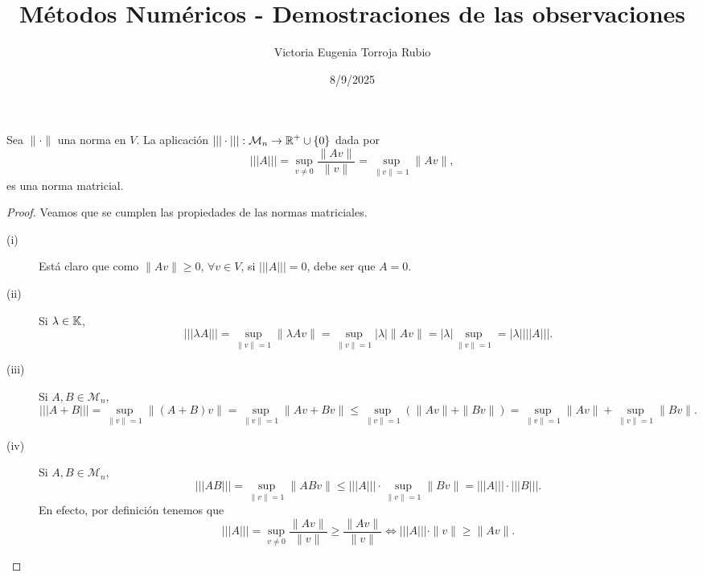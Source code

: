 \documentclass{article}
\begin{document}
\title{Métodos Numéricos - Demostraciones de las observaciones}
\author{Victoria Eugenia Torroja Rubio}
\date{8/9/2025}

\maketitle

\begin{prop}
	Sea $\displaystyle \| \cdot \|  $ una norma en $\displaystyle V $. La aplicación $\displaystyle | | | \cdot | | | : \mathcal{M}_{n} \to \mathbb{R}^{+}\cup \left\{ 0\right\}  $ dada por 
	\[ | | | A | | | = \sup_{v \neq 0}\frac{\| Av \|}{\|v\|} = \sup_{\|v\|=1}\|Av\| ,\]
	es una norma matricial.
\end{prop}
\begin{proof}
Veamos que se cumplen las propiedades de las normas matriciales.
\begin{description}
\item[(i)] Está claro que como $\displaystyle \| A v\| \geq 0 $, $\displaystyle \forall v \in V $, si $\displaystyle | | | A | | | = 0 $, debe ser que $\displaystyle A = 0$.
\item[(ii)] Si $\displaystyle \lambda \in \mathbb{K} $, 
	\[| | | \lambda A | | | = \sup_{\|v\| = 1}\|\lambda Av\| = \sup_{\|v\| = 1} \left|\lambda \right|\|Av\| = \left|\lambda \right|\sup_{\|v\| = 1} = \left|\lambda \right| | | | A | | | .\]
\item[(iii)] Si $\displaystyle A,B \in \mathcal{M}_{n} $,
	\[ | | | A + B | | | = \sup_{\|v\| = 1}\| \left(A + B\right) v \| = \sup_{\|v\| = 1} \| A v + Bv \| \leq \sup_{\|v\| = 1}\left(\|Av\|+\|Bv\|\right) = \sup_{\|v\| = 1}\|Av\| + \sup_{\|v\| = 1}\|Bv\| .\]
\item[(iv)] Si $\displaystyle A,B \in \mathcal{M}_{n} $,
	\[| | | AB | | | = \sup_{\|v\| = 1}\|ABv\| \leq | | | A | | | \cdot \sup_{\|v\| = 1}\|Bv\| = | | | A | | | \cdot | | | B | | | .\]
	En efecto, por definición tenemos que 
	\[ | | | A | | | = \sup_{v \neq 0}\frac{\|Av\|}{\|v\|} \geq \frac{\|Av\|}{\|v\|} \iff | | | A | | | \cdot \|v\| \geq \|Av\| .\]
\end{description}
\end{proof}
\end{document}
